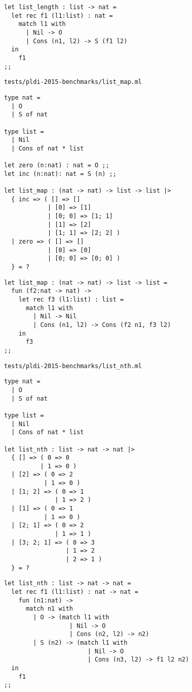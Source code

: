 \begin{verbatim}
let list_length : list -> nat =
  let rec f1 (l1:list) : nat =
    match l1 with
      | Nil -> O
      | Cons (n1, l2) -> S (f1 l2)
  in
    f1
;;
\end{verbatim}

\noindent\large\texttt{tests/pldi-2015-benchmarks/list\_map.ml}
\begin{verbatim}
type nat =
  | O
  | S of nat

type list =
  | Nil
  | Cons of nat * list

let zero (n:nat) : nat = O ;;
let inc (n:nat): nat = S (n) ;;

let list_map : (nat -> nat) -> list -> list |>
  { inc => ( [] => []
            | [0] => [1]
            | [0; 0] => [1; 1]
            | [1] => [2]
            | [1; 1] => [2; 2] )
  | zero => ( [] => []
            | [0] => [0]
            | [0; 0] => [0; 0] )
  } = ?
\end{verbatim}

\begin{verbatim}
let list_map : (nat -> nat) -> list -> list =
  fun (f2:nat -> nat) ->
    let rec f3 (l1:list) : list =
      match l1 with
        | Nil -> Nil
        | Cons (n1, l2) -> Cons (f2 n1, f3 l2)
    in
      f3
;;
\end{verbatim}

\noindent\large\texttt{tests/pldi-2015-benchmarks/list\_nth.ml}
\begin{verbatim}
type nat =
  | O
  | S of nat

type list =
  | Nil
  | Cons of nat * list

let list_nth : list -> nat -> nat |>
  { [] => ( 0 => 0
          | 1 => 0 )
  | [2] => ( 0 => 2
           | 1 => 0 )
  | [1; 2] => ( 0 => 1
              | 1 => 2 )
  | [1] => ( 0 => 1
           | 1 => 0 )
  | [2; 1] => ( 0 => 2
              | 1 => 1 )
  | [3; 2; 1] => ( 0 => 3
                 | 1 => 2
                 | 2 => 1 )
  } = ?
\end{verbatim}

\begin{verbatim}
let list_nth : list -> nat -> nat =
  let rec f1 (l1:list) : nat -> nat =
    fun (n1:nat) ->
      match n1 with
        | O -> (match l1 with
                  | Nil -> O
                  | Cons (n2, l2) -> n2)
        | S (n2) -> (match l1 with
                       | Nil -> O
                       | Cons (n3, l2) -> f1 l2 n2)
  in
    f1
;;
\end{verbatim}

